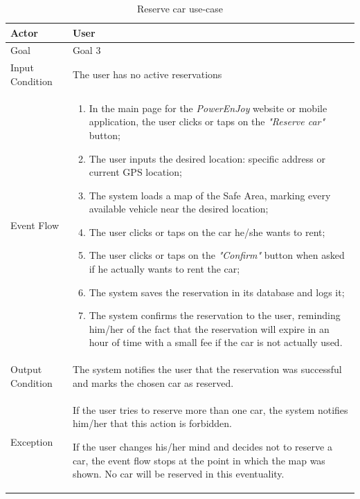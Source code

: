 \begin{table}[H]
\begin{center}
\begin{tabular}{p{} | p{}}
\hline
Actor & User\\
\hline
Goal & Goal 3\\
\hline
Input Condition & The user has no active reservations\\
\hline
Event Flow & 
\begin{enumerate}
\item In the main page for the \emph{PowerEnJoy} website or mobile application, the user clicks or taps on the \emph{"Reserve car"} button;
\item The user inputs the desired location: specific address or current GPS location;
\item The system loads a map of the Safe Area, marking every available vehicle near the desired location;
\item The user clicks or taps on the car he/she wants to rent;
\item The user clicks or taps on the \emph{"Confirm"} button when asked if he actually wants to rent the car;
\item The system saves the reservation in its database and logs it;
\item The system confirms the reservation to the user, reminding him/her of the fact that the reservation will expire in an hour of time with a small fee if the car is not actually used.
\end{enumerate} \\
\hline
Output Condition & The system notifies the user that the reservation was successful and marks the chosen car as reserved.\\
\hline
Exception & If the user tries to reserve more than one car, the system notifies him/her that this action is forbidden.

If the user changes his/her mind and decides not to reserve a car, the event flow stops at the point in which the map was shown. No car will be reserved in this eventuality.\\
\hline
\end{tabular}
\end{center}
\caption{Reserve car use-case}
\label{reserve_car_uc}
\end{table}

